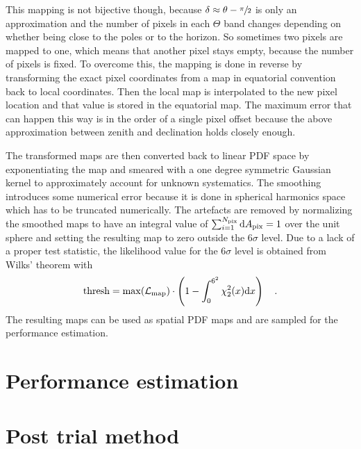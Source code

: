 This mapping is not bijective though, because $\delta \approx \theta - \sfrac{\pi}{2}$ is only an approximation and the number of pixels in each $\Theta$ band changes depending on whether being close to the poles or to the horizon.
So sometimes two pixels are mapped to one, which means that another pixel stays empty, because the number of pixels is fixed.
To overcome this, the mapping is done in reverse by transforming the exact pixel coordinates from a map in equatorial convention back to local coordinates.
Then the local map is interpolated to the new pixel location and that value is stored in the equatorial map.
The maximum error that can happen this way is in the order of a single pixel offset because the above approximation between zenith and declination holds closely enough.

The transformed maps are then converted back to linear PDF space by exponentiating the map and smeared with a one degree symmetric Gaussian kernel to approximately account for unknown systematics.
The smoothing introduces some numerical error because it is done in spherical harmonics space which has to be truncated numerically.
The artefacts are removed by normalizing the smoothed maps to have an integral value of $\sum_{i=1}^{N_\text{pix}} \mathrm{d}A_\text{pix} = 1$ over the unit sphere and setting the resulting map to zero outside the $6\sigma$ level.
Due to a lack of a proper test statistic, the likelihood value for the $6\sigma$ level is obtained from Wilks' theorem with
\begin{equation}
  \text{thresh} =
    \max(\mathcal{L}_\text{map})\cdot
    \left(1 - \int_0^{6^2}\chi^2_{2}(x)\mathrm{d}x\right)
  \quad\text{.}
\end{equation}
The resulting maps can be used as spatial PDF maps and are sampled for the performance estimation.


\section{Performance estimation}


\section{Post trial method}

